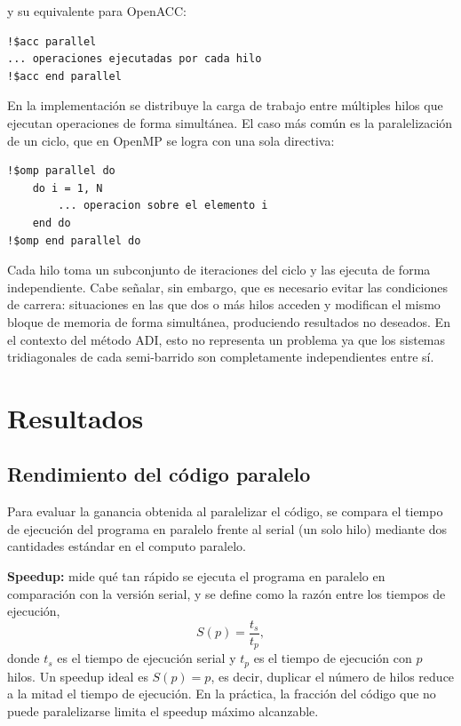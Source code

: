 \documentclass[11pt,a4paper,twocolumn]{article}
\begin{document}
y su equivalente para OpenACC:

\begin{lstlisting}[style=fortran]
!$acc parallel
... operaciones ejecutadas por cada hilo
!$acc end parallel
\end{lstlisting}

En la implementación se distribuye la carga de trabajo entre múltiples
hilos que ejecutan operaciones de forma simultánea. El caso más común
es la paralelización de un ciclo, que en OpenMP se logra con una sola
directiva:

\begin{lstlisting}[style=fortran]
!$omp parallel do
    do i = 1, N
        ... operacion sobre el elemento i
    end do
!$omp end parallel do
\end{lstlisting}

Cada hilo toma un subconjunto de iteraciones del ciclo y las ejecuta de forma independiente. 
Cabe señalar, sin embargo, que es necesario evitar las condiciones de carrera: 
situaciones en las que dos o más hilos acceden y modifican el mismo bloque de memoria de forma simultánea, 
produciendo resultados no deseados. En el contexto del método ADI, esto no representa un problema ya que 
los sistemas tridiagonales de cada semi-barrido son completamente independientes entre sí.


\section{Resultados}
\label{sec:Resultados}

\subsection{Rendimiento del código paralelo}

Para evaluar la ganancia obtenida al paralelizar el código, se compara
el tiempo de ejecución del programa en paralelo frente al serial
(un solo hilo) mediante dos cantidades estándar en el computo paralelo.

\textbf{Speedup:} mide qué tan rápido se ejecuta el programa en
paralelo en comparación con la versión serial, y se define como la
razón entre los tiempos de ejecución,
\begin{equation}
    S(p) = \frac{t_s}{t_p},
    \label{eq:speedup}
\end{equation}
donde $t_s$ es el tiempo de ejecución serial y $t_p$ es el tiempo de
ejecución con $p$ hilos. Un speedup ideal es $S(p) = p$, es decir,
duplicar el número de hilos reduce a la mitad el tiempo de ejecución.
En la práctica, la fracción del código que no puede paralelizarse
limita el speedup máximo alcanzable.
\end{document}
